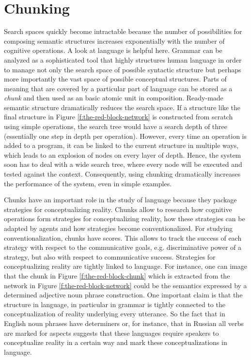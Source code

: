 \section{Chunking}
Search spaces quickly become intractable because the number of 
possibilities for composing semantic structures increases exponentially 
with the number of cognitive operations. A look at language
is helpful here. Grammar can be analyzed as a sophisticated
tool that highly structures human language in order to manage not only
the search space of possible syntactic structure \citep{steels2006dampen} but
perhaps more importantly the vast space of possible conceptual
structures. Parts of meaning that are covered by a particular
part of language can be stored as a \emph{chunk} and 
then used as an basic atomic unit in composition.
Ready-made semantic structure dramatically reduces the search space. If a structure like
the final structure in Figure \ref{f:the-red-block-network} is
constructed from scratch using simple operations, the search tree
would have a search depth of three (essentially one step in depth per
operation). However, every time an operation is added to a program, it
can be linked to the current structure in multiple ways, which leads
to an explosion of nodes on every layer of depth. Hence, the system
soon has to deal with a wide search tree, where every node will be 
executed and tested against the context. Consequently, using chunking 
dramatically increases the performance of the system, even in simple examples.

Chunks have an important role in the study of language because
they package strategies for conceptualizing reality.
Chunks allow to research how cognitive operations
form strategies for conceptualizing reality, how these
strategies can be adapted by agents and how strategies
become conventionalized. For studying conventionalization, 
chunks have scores. This allows to track the success of each strategy with
respect to the communicative goals, e.g. discriminative power
of a strategy, but also with respect to communicative success. 
Strategies for conceptualizing reality are tightly linked to 
language. For instance, one can image that the
chunk in Figure \ref{f:the-red-block-chunk} which 
is extracted from the network in Figure \ref{f:the-red-block-network}
could be the semantics expressed by a determined adjective
noun phrase construction. One important claim is that the structure in language, 
in particular in grammar is tightly connected to the conceptualization
of reality underlying every utterance. So the fact that in English
noun phrases have determiners or, for instance, that in Russian all
verbs are marked for aspects suggests that these languages 
require speakers to conceptualize reality in a certain way and
mark these conceptualizations in language. 



